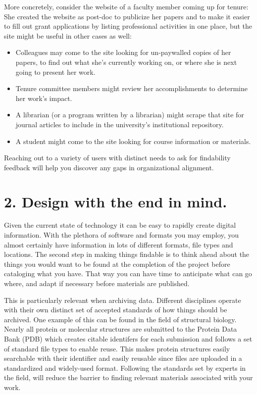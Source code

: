 \documentclass[10pt,letterpaper]{article}
\newcommand{\rulemajor}[1]{\section*{#1}}
\begin{document}
More concretely, consider the website of a faculty member coming up for tenure:
She created the website as post-doc to publicize her papers and to make it
easier to fill out grant applications by listing professional activities in one
place, but the site might be useful in other cases as well:

\begin{itemize}

\item
  Colleagues may come to the site looking for un-paywalled copies of her
  papers, to find out what she's currently working on, or where she is next
  going to present her work.

\item
  Tenure committee members might review her accomplishments to determine her
  work's impact.

\item
  A librarian (or a program written by a librarian) might scrape that site for
  journal articles to include in the university's institutional repository.

\item
  A student might come to the site looking for course information or materials.

\end{itemize}

Reaching out to a variety of users with distinct needs to ask for findability feedback will
help you discover any gaps in organizational alignment.

\rulemajor{2. Design with the end in mind.}

Given the current state of technology it can be easy to rapidly create digital
information. With the plethora of software and formats you may employ, you almost
certainly have information in lots of different formats, file types and locations.
The second step in making things findable is to think ahead about the things you
would want to be found at the completion of the project before cataloging what you
have. That way you can have time to anticipate what can go where, and adapt if
necessary before materials are published. 

This is particularly relevant when
archiving data. Different disciplines operate with their own distinct set of
accepted standards of how things should be archived. One example of this can be
found in the field of structural biology. Nearly all protein or molecular
structures are submitted to the Protein Data Bank (PDB) which creates citable
identifers for each submission and follows a set of standard file types to enable 
reuse. This makes protein structures easily searchable with their identifier 
and easily reusable since files are uploaded in a standardized and widely-used 
format\cite{Wilkinson2016}. Following the standards set by experts in the field, 
will reduce the barrier to finding relevant materials associated with your work.
\end{document}
